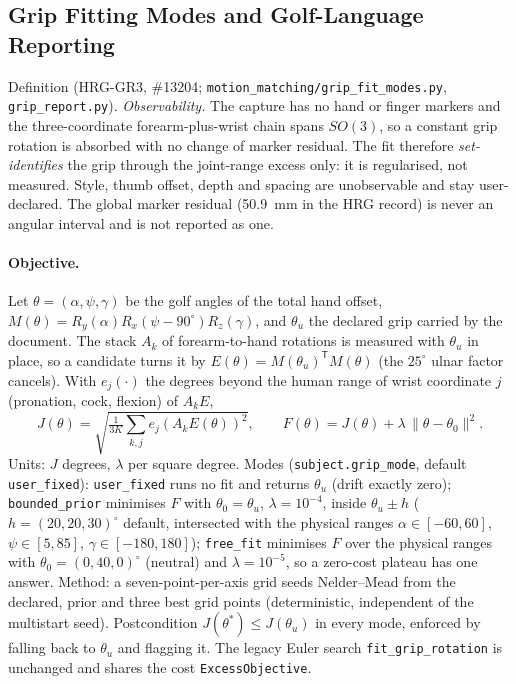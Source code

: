 \documentclass[11pt,a4paper]{article}
\begin{document}
\subsection{Grip Fitting Modes and Golf-Language Reporting}
Definition (HRG-GR3, \#13204; \texttt{motion\_matching/grip\_fit\_modes.py},
\texttt{grip\_report.py}). \emph{Observability.} The capture has no hand or
finger markers and the three-coordinate forearm-plus-wrist chain spans
$SO(3)$, so a constant grip rotation is absorbed with no change of marker
residual. The fit therefore \emph{set-identifies} the grip through the
joint-range excess only: it is regularised, not measured. Style, thumb offset,
depth and spacing are unobservable and stay user-declared. The global marker
residual (50.9~mm in the HRG record) is never an angular interval and is not
reported as one.

\paragraph{Objective.}
Let $\theta=(\alpha,\psi,\gamma)$ be the golf angles of the total hand offset,
$M(\theta)=R_y(\alpha)R_x(\psi-90^\circ)R_z(\gamma)$, and $\theta_u$ the
declared grip carried by the document. The stack $A_k$ of forearm-to-hand
rotations is measured with $\theta_u$ in place, so a candidate turns it by
$E(\theta)=M(\theta_u)^{\mathsf T}M(\theta)$ (the $25^\circ$ ulnar factor
cancels). With $e_j(\cdot)$ the degrees beyond the human range of wrist
coordinate $j$ (pronation, cock, flexion) of $A_kE$,
\begin{equation}
J(\theta)=\sqrt{\tfrac1{3K}\textstyle\sum_{k,j}e_j(A_kE(\theta))^2},\qquad
F(\theta)=J(\theta)+\lambda\,\lVert\theta-\theta_0\rVert^2 .
\end{equation}
Units: $J$ degrees, $\lambda$ per square degree. Modes (\texttt{subject.grip\_mode},
default \texttt{user\_fixed}):
\texttt{user\_fixed} runs no fit and returns $\theta_u$ (drift exactly zero);
\texttt{bounded\_prior} minimises $F$ with $\theta_0=\theta_u$,
$\lambda=10^{-4}$, inside $\theta_u\pm h$ ($h=(20,20,30)^\circ$ default,
intersected with the physical ranges $\alpha\in[-60,60]$, $\psi\in[5,85]$,
$\gamma\in[-180,180]$); \texttt{free\_fit} minimises $F$ over the physical
ranges with $\theta_0=(0,40,0)^\circ$ (neutral) and $\lambda=10^{-5}$, so a
zero-cost plateau has one answer. Method: a seven-point-per-axis grid seeds
Nelder--Mead from the declared, prior and three best grid points
(deterministic, independent of the multistart seed). Postcondition
$J(\theta^\ast)\le J(\theta_u)$ in every mode, enforced by falling back to
$\theta_u$ and flagging it. The legacy Euler search \texttt{fit\_grip\_rotation}
is unchanged and shares the cost \texttt{ExcessObjective}.
\end{document}
